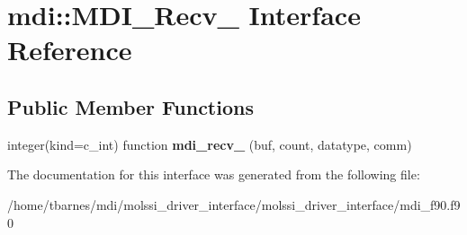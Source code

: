 \hypertarget{interfacemdi_1_1MDI__Recv__}{\section{mdi\-:\-:M\-D\-I\-\_\-\-Recv\-\_\- Interface Reference}
\label{interfacemdi_1_1MDI__Recv__}
}
\subsection*{Public Member Functions}
\begin{DoxyCompactItemize}
\item 
\hypertarget{interfacemdi_1_1MDI__Recv___a8a02f4e2009b1219ed101b4b2c2584ed}{integer(kind=c\-\_\-int) function {\bfseries mdi\-\_\-recv\-\_\-} (buf, count, datatype, comm)}\label{interfacemdi_1_1MDI__Recv___a8a02f4e2009b1219ed101b4b2c2584ed}

\end{DoxyCompactItemize}


The documentation for this interface was generated from the following file\-:\begin{DoxyCompactItemize}
\item 
/home/tbarnes/mdi/molssi\-\_\-driver\-\_\-interface/molssi\-\_\-driver\-\_\-interface/mdi\-\_\-f90.\-f90\end{DoxyCompactItemize}
